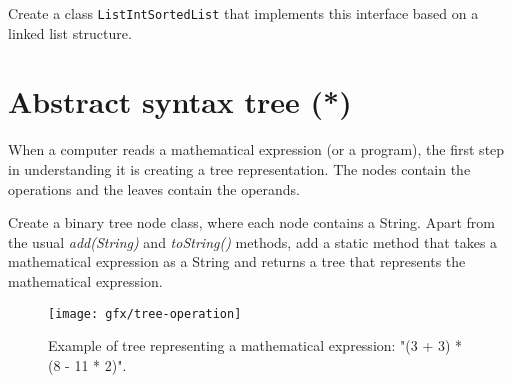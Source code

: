 \documentclass{article}
\begin{document}
Create a class \verb+ListIntSortedList+ that implements this interface based
on a linked list structure. 


\section{Abstract syntax tree (*)}
\label{sec:abstract-tree-}

When a computer reads a mathematical expression (or a program), the
first step in understanding it is creating a tree representation. The
nodes contain the operations and the leaves contain the operands. 

Create a binary tree node class, where each node contains a
String. Apart from the usual \emph{add(String)} and \emph{toString()}
methods, add a static method that takes a mathematical expression as a
String and returns a tree that represents the mathematical
expression. 

\begin{figure}[hbtp]
  \centering
  \texttt{[image: gfx/tree-operation]}
  \caption{Example of tree representing a mathematical expression: "(3 + 3) * (8 - 11 * 2)".}
  \label{fig:jjgg}
\end{figure}
\end{document}
